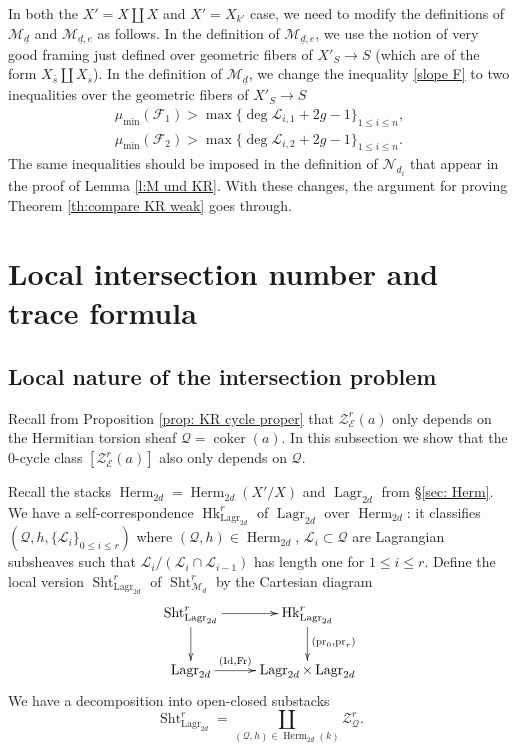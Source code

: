 \documentclass[reqno]{amsart}
\numberwithin{equation}{section}
\DeclareMathOperator{\Frob}{Fr}
\DeclareMathOperator{\coker}{coker}
\DeclareMathOperator{\Id}{Id}
\DeclareMathOperator{\Sht}{Sht}
\DeclareMathOperator{\pr}{pr}
\DeclareMathOperator{\Hk}{Hk}
\DeclareMathOperator{\Herm}{Herm}
\DeclareMathOperator{\Lagr}{Lagr}
\newcommand\un{\underline}
\newcommand{\ov}{\overline}
\newcommand{\ph}{\varphi}
\newcommand\cE{\mathcal{E}}
\newcommand\cF{\mathcal{F}}
\newcommand\cL{\mathcal{L}}
\newcommand\cM{\mathcal{M}}
\newcommand\cN{\mathcal{N}}
\newcommand\cQ{\mathcal{Q}}
\newcommand\cZ{\mathcal{Z}}
\theoremstyle{remark}
\numberwithin{equation}{section}
\begin{document}
In both the $X'=X\coprod X$ and $X'=X_{k'}$ case, we need to modify the definitions of $\cM_{\un d}$ and $\cM_{\un d,e}$ as follows. In the definition of $\cM_{\un d,e}$, we use the notion of very good framing just defined over geometric fibers of $X'_{S}\to S$ (which are of the form $X_{\ov s}\coprod X_{\ov s}$).  In the definition of $\cM_{\un d}$, we change the inequality \eqref{slope F} to two inequalities over the geometric fibers of $X'_{S}\to S$
\begin{eqnarray*}
\mu_{\min}(\cF_{1})>\max\{\deg\cL_{i,1}+2g-1\}_{1\le i\le n},\\
\mu_{\min}(\cF_{2})>\max\{\deg\cL_{i,2}+2g-1\}_{1\le i\le n}.
\end{eqnarray*}
The same inequalities should be imposed in the definition of $\cN_{d_{i}}$ that appear in the proof of Lemma \ref{l:M und KR}. With these changes, the argument for proving Theorem \ref{th:compare KR weak} goes through.



\section{Local intersection number and trace formula}\label{s:int trace}

\subsection{Local nature of the intersection problem}Recall from Proposition \ref{prop: KR cycle proper} that $\cZ^{r}_{\cE}(a)$ only depends on the Hermitian torsion sheaf $\cQ=\coker(a)$. In this subsection we show that the $0$-cycle class $[\cZ^{r}_{\cE}(a)]$ also only depends on $\cQ$. 

Recall the stacks $\Herm_{2d}=\Herm_{2d}(X'/X)$ and $\Lagr_{2d}$ from \S \ref{sec: Herm}. We have a self-correspondence $\Hk^{r}_{\Lagr_{2d}}$ of $\Lagr_{2d}$ over $\Herm_{2d}$: it classifies 
$(\cQ,h,\{\cL_{i}\}_{0\le i\le r})$ where $(\cQ,h)\in \Herm_{2d}$, $\cL_{i}\subset \cQ$ are Lagrangian subsheaves such that $\cL_{i}/(\cL_{i}\cap \cL_{i-1})$ has length one for $1\le i\le r$. 
Define the local version $\Sht^{r}_{\Lagr_{2d}}$ of $\Sht^{r}_{\cM_{d}}$ by the Cartesian diagram
\begin{equation}\label{Sht Lag}
\xymatrix{\Sht^{r}_{\Lagr_{2d}}\ar[d] \ar[r] & \Hk^{r}_{\Lagr_{2d}}\ar[d]^{(\pr_{0},\pr_{r})}\\
\Lagr_{2d}\ar[r]^-{(\Id,\Frob)} & \Lagr_{2d}\times\Lagr_{2d}}
\end{equation}
We have a decomposition into open-closed substacks
\begin{equation}
\Sht^{r}_{\Lagr_{2d}}=\coprod_{(\cQ,h)\in\Herm_{2d}(k)} \cZ^{r}_{\cQ}.
\end{equation}
\end{document}
